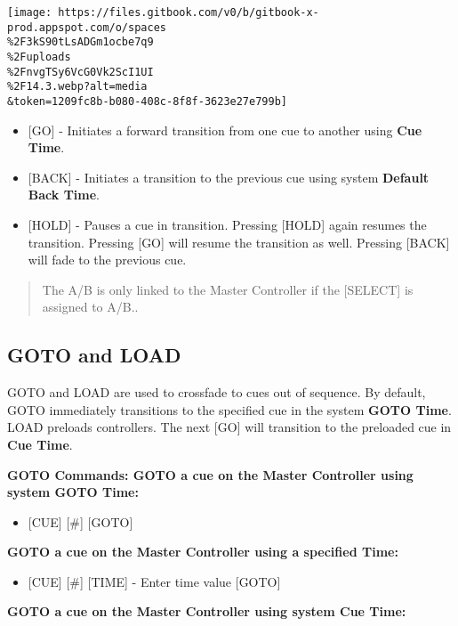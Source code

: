 \documentclass[
]{article}
\providecommand{\tightlist}{%
  \setlength{\itemsep}{0pt}\setlength{\parskip}{0pt}}
\begin{document}
\texttt{[image: https://files.gitbook.com/v0/b/gitbook-x-prod.appspot.com/o/spaces\\\%2F3kS90tLsADGm1ocbe7q9\\\%2Fuploads\\\%2FnvgTSy6VcG0Vk2ScI1UI\\\%2F14.3.webp?alt=media\\\&token=1209fc8b-b080-408c-8f8f-3623e27e799b]}

\begin{itemize}
\item
  {[}GO{]} - Initiates a forward transition from one cue to another using \textbf{Cue Time}.
\item
  {[}BACK{]} - Initiates a transition to the previous cue using system \textbf{Default Back Time}.
\item
  {[}HOLD{]} - Pauses a cue in transition. Pressing {[}HOLD{]} again resumes the transition. Pressing {[}GO{]} will resume the transition as well. Pressing {[}BACK{]} will fade to the previous cue.
\end{itemize}

\begin{quote}
{The A/B is only linked to the Master Controller if the {[}SELECT{]} is assigned to A/B.}.
\end{quote}

\hypertarget{goto-and-load}{%
\subsection{GOTO and LOAD}\label{goto-and-load}}

GOTO and LOAD are used to crossfade to cues out of sequence. By default, GOTO immediately transitions to the specified cue in the system \textbf{GOTO Time}. LOAD preloads controllers. The next {[}GO{]} will transition to the preloaded cue in \textbf{Cue Time}.

\textbf{GOTO Commands: GOTO a cue on the Master Controller using system GOTO Time:}

\begin{itemize}
\tightlist
\item
  {[}CUE{]} {[}\#{]} {[}GOTO{]}
\end{itemize}

\textbf{GOTO a cue on the Master Controller using a specified Time:}

\begin{itemize}
\tightlist
\item
  {[}CUE{]} {[}\#{]} {[}TIME{]} - Enter time value {[}GOTO{]}
\end{itemize}

\textbf{GOTO a cue on the Master Controller using system Cue Time:}
\end{document}
